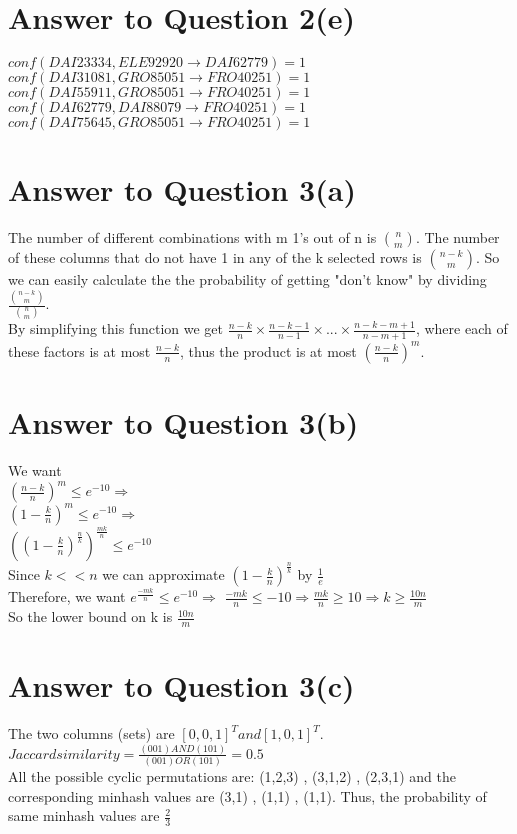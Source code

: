\documentclass[11pt]{article}
\begin{document}
\pagebreak[4]
\section*{Answer to Question 2(e)}
$conf(DAI23334,ELE92920 \rightarrow DAI62779) = 1 $\\
$conf(DAI31081,GRO85051 \rightarrow FRO40251) = 1$ \\
$conf(DAI55911,GRO85051 \rightarrow FRO40251) = 1$ \\
$conf(DAI62779,DAI88079 \rightarrow FRO40251) = 1$ \\
$conf(DAI75645,GRO85051 \rightarrow FRO40251 ) = 1$ \\
\pagebreak[4]
\section*{Answer to Question 3(a)}
The number of different combinations with m 1's out of n is  $\binom{n}{m}.$ The number of these columns that do not have 1 in any of the k selected rows is $\binom{n-k}{m}.$ So we can easily calculate the the probability of getting "don't know" by dividing $\frac{\binom{n-k}{m}}{\binom{n}{m}}$.\\
By simplifying this function we get $\frac{n-k}{n}\times \frac{n-k-1}{n-1}\times ... \times \frac{n-k-m+1}{n-m+1}$, where each of these factors is at most $\frac{n-k}{n}$, thus the product is at most $ (\frac{n-k}{n})^{m}$.
\pagebreak[4]
\section*{Answer to Question 3(b)}
We want\\
 $ (\frac{n-k}{n})^{m} \leq e^{-10} \Rightarrow $\\
  $ (1 - \frac{k}{n})^{m} \leq e^{-10} \Rightarrow $\\
    $ ((1 - \frac{k}{n})^{\frac{n}{k}})^{\frac{mk}{n}} \leq e^{-10} $\\ Since  $k<<n$ we can approximate $(1 - \frac{k}{n})^{\frac{n}{k}}$ by $\frac{1}{e}$\\
   Therefore, we want $e^{\frac{-mk}{n}} \leq e^{-10}\Rightarrow$ 
   $\frac{-mk}{n} \leq -10 \Rightarrow
     \frac{mk}{n} \geq 10\Rightarrow
   k \geq \frac{10n}{m}$\\
   So the lower bound on k is $ \frac{10n}{m}$
    
\pagebreak[4]
\section*{Answer to Question 3(c)}
The two columns (sets) are $[0,0,1]^T and [1,0,1]^T$. $Jaccard similarity = \frac{(001) AND (101)}{(001) OR (101)}=0.5$\\
All the possible cyclic permutations are: (1,2,3) , (3,1,2) , (2,3,1) and the corresponding minhash values are (3,1) , (1,1) , (1,1). Thus, the probability of same minhash values are $\frac{2}{3}$
\end{document}
